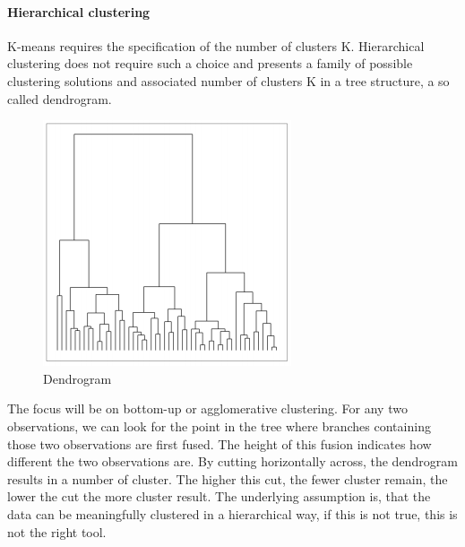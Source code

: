 \documentclass[../document.tex]{subfiles}
\begin{document}
	\paragraph{Hierarchical clustering}
	K-means requires the specification of the number of clusters K. Hierarchical clustering does not require such a choice and presents a family of possible clustering solutions and associated number of clusters K in a tree structure, a so called dendrogram.
	\begin{figure}
		\centering
		\includegraphics[width=0.7\linewidth]{pictures/dendrogram}
		\caption{Dendrogram}
		\label{fig:dendrogram}
	\end{figure}

	The focus will be on bottom-up or agglomerative clustering. For any two observations, we can look for the point in the tree where branches containing those two observations are first fused. The height of this fusion indicates how different the two observations are. By cutting horizontally across, the dendrogram results in a number of cluster. The higher this cut, the fewer cluster remain, the lower the cut the more cluster result. The underlying assumption is, that the data can be meaningfully clustered in a hierarchical way, if this is not true, this is not the right tool.
\end{document}
